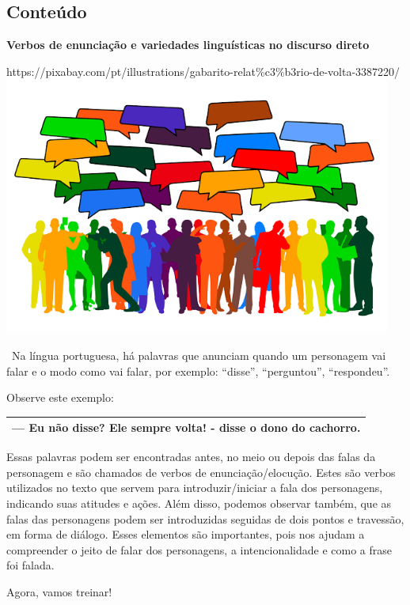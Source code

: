\begin{itemize}
{{{\begin{itemize}
\begin{itemize}
\begin{itemize}
\subsection{Conteúdo}\label{conteuxfado-5}

\textbf{Verbos de enunciação e variedades linguísticas no discurso
direto}

https://pixabay.com/pt/illustrations/gabarito-relat\%c3\%b3rio-de-volta-3387220/\includegraphics[width=5.01488in,height=3.34306in]{media/image21.png}

~Na língua portuguesa, há palavras que anunciam quando um personagem vai
falar e o modo como vai falar, por exemplo: ``disse'', ``perguntou'',
``respondeu''.

Observe este exemplo:

\begin{longtable}[]{@{}l@{}}
\toprule
--- Eu não disse? Ele sempre volta! - \textbf{disse} o dono do
cachorro.\tabularnewline
\bottomrule
\end{longtable}

Essas palavras podem ser encontradas antes, no meio ou depois das falas
da personagem e são chamados de verbos de enunciação/elocução. Estes são
verbos utilizados no texto que servem para introduzir/iniciar a fala dos
personagens, indicando suas atitudes e ações. Além disso, podemos
observar também, que as falas das personagens podem ser introduzidas
seguidas de dois pontos e travessão, em forma de diálogo. Esses
elementos são importantes, pois nos ajudam a compreender o jeito de
falar dos personagens, a intencionalidade e como a frase foi falada.

Agora, vamos treinar!



\end{itemize}
\end{itemize}
\end{itemize}}}}
\end{itemize}
